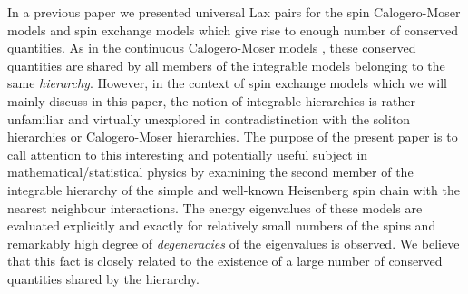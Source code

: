 \documentclass[a4paper,12pt]{article}
\begin{document}


In a previous paper \cite{is1} we
 presented universal Lax pairs for the spin Calogero-Moser
 models \cite{suthsha2,fmp,HikWa} and spin exchange  models
\cite{halsha,ino1,simal,ino2} which give rise to enough
number of conserved quantities. As in the continuous Calogero-Moser models
\cite{Cal,Sut,CalMo}, these conserved quantities are shared by
all members of the
integrable models belonging to the same {\em hierarchy}.
However, in the context of
spin exchange models which we will mainly discuss in this paper, the notion
of
integrable hierarchies is rather unfamiliar and virtually unexplored in
contradistinction with the soliton hierarchies or Calogero-Moser
hierarchies.
The purpose of the present paper is to call attention to this interesting
and
potentially  useful subject in mathematical/statistical
physics by examining the
second member of the integrable hierarchy of the simple
and well-known Heisenberg
spin chain with the nearest neighbour interactions.
The energy eigenvalues of these models are evaluated explicitly and
exactly  for
relatively small  numbers of the spins and remarkably high degree of {\em
degeneracies} of the eigenvalues is observed. We believe that this fact
is  closely related to the existence of a large number of
conserved quantities shared
by the hierarchy.
\end{document}
